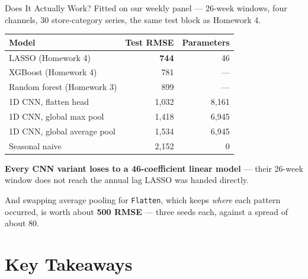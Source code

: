 \documentclass[aspectratio=169, 11pt]{beamer}
\begin{document}
\begin{frame}{Does It Actually Work?}
  Fitted on our weekly panel --- 26-week windows, four channels, 30 store-category series, the
  same test block as Homework 4.
  \begin{center}
    {\small
    \begin{tabular}{lrr}
      \toprule
      \textbf{Model} & \textbf{Test RMSE} & \textbf{Parameters} \\
      \midrule
      LASSO (Homework 4) & \textbf{744} & 46 \\
      XGBoost (Homework 4) & 781 & --- \\
      Random forest (Homework 3) & 899 & --- \\
      \midrule
      1D CNN, flatten head & 1{,}032 & 8{,}161 \\
      1D CNN, global max pool & 1{,}418 & 6{,}945 \\
      1D CNN, global average pool & 1{,}534 & 6{,}945 \\
      \midrule
      Seasonal naive & 2{,}152 & 0 \\
      \bottomrule
    \end{tabular}
    }
  \end{center}

  \vspace{-0.2cm}
  \textbf{Every CNN variant loses to a 46-coefficient linear model} --- their 26-week window
  does not reach the annual lag LASSO was handed directly.

  \vspace{0.05cm}
  And swapping average pooling for \texttt{Flatten}, which keeps \emph{where} each pattern
  occurred, is worth about \textbf{500 RMSE} --- three seeds each, against a spread of about 80.
\end{frame}

\section{Key Takeaways}

\end{document}
